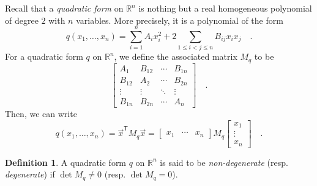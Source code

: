 \documentclass[pdftex,a4paper,12pt]{scrartcl}
\theoremstyle{plain}
\theoremstyle{definition}
\newtheorem{definition}{Definition}
\theoremstyle{remark}
\numberwithin{equation}{section}
\begin{document}
Recall that a \emph{quadratic form} on $\mathbb R^n$ is nothing but a real homogeneous polynomial of degree $2$ with $n$ variables.
More precisely, it is a polynomial of the form
\begin{equation}
\label{eq:quad-form-alph}
q(x_1,\dots,x_n)
= \sum_{i=1}^n A_ix_i^2+2\sum_{1\le i<j\le n} B_{ij}x_ix_j
\quad.
\end{equation}
For a quadratic form $q$ on $\mathbb R^n$, we define the associated matrix $M_q$ to be
\[
\begin{bmatrix}
A_1 & B_{12} & \cdots & B_{1n} \\
B_{12} & A_2 & \cdots & B_{2n} \\
\vdots & \vdots & \ddots & \vdots \\
B_{1n} & B_{2n} & \cdots & A_n
\end{bmatrix}
\quad.
\]
Then, we can write
\begin{equation}
\label{eq:quad-form-mat}
q(x_1,\dots,x_n)
= \vec x^{\mathsf T} M_q\vec x
=
\begin{bmatrix}
x_1 & \cdots & x_n
\end{bmatrix}
M_q
\begin{bmatrix}
x_1 \\ \vdots \\ x_n
\end{bmatrix}
\quad.
\end{equation}

\begin{definition}
A quadratic form $q$ on $\mathbb R^n$ is said to be \emph{non-degenerate} (resp. \emph{degenerate}) if $\det M_q\neq 0$ (resp. $\det M_q=0$).
\end{definition}
\end{document}
